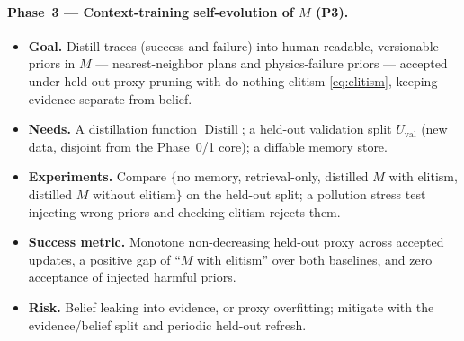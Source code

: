 \paragraph{Phase~3 --- Context-training self-evolution of $M$ (P3).}
\begin{itemize}
  \item \textbf{Goal.} Distill traces (success and failure) into human-readable,
    versionable priors in $M$ --- nearest-neighbor plans and physics-failure
    priors --- accepted under held-out proxy pruning with do-nothing elitism
    \eqref{eq:elitism}, keeping evidence separate from belief.
  \item \textbf{Needs.} A distillation function $\operatorname{Distill}$; a held-out
    validation split $U_{\mathrm{val}}$ (new data, disjoint from the Phase~0/1
    core); a diffable memory store.
  \item \textbf{Experiments.} Compare $\{$no memory, retrieval-only, distilled
    $M$ with elitism, distilled $M$ without elitism$\}$ on the held-out split; a
    pollution stress test injecting wrong priors and checking elitism rejects
    them.
  \item \textbf{Success metric.} Monotone non-decreasing held-out proxy across
    accepted updates, a positive gap of ``$M$ with elitism'' over both baselines,
    and zero acceptance of injected harmful priors.
  \item \textbf{Risk.} Belief leaking into evidence, or proxy overfitting;
    mitigate with the evidence/belief split and periodic held-out refresh.
\end{itemize}

